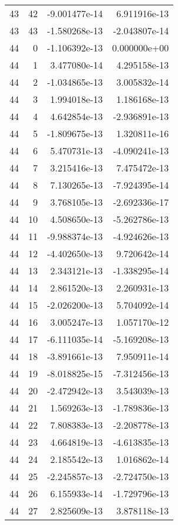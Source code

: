 \begin{tabular}{rrrr}
  43 &   42 & -9.001477e-14 &  6.911916e-13 \\
  43 &   43 & -1.580268e-13 & -2.043807e-14 \\
  44 &    0 & -1.106392e-13 &  0.000000e+00 \\
  44 &    1 &  3.477080e-14 &  4.295158e-13 \\
  44 &    2 & -1.034865e-13 &  3.005832e-14 \\
  44 &    3 &  1.994018e-13 &  1.186168e-13 \\
  44 &    4 &  4.642854e-13 & -2.936891e-13 \\
  44 &    5 & -1.809675e-13 &  1.320811e-16 \\
  44 &    6 &  5.470731e-13 & -4.090241e-13 \\
  44 &    7 &  3.215416e-13 &  7.475472e-13 \\
  44 &    8 &  7.130265e-13 & -7.924395e-14 \\
  44 &    9 &  3.768105e-13 & -2.692336e-17 \\
  44 &   10 &  4.508650e-13 & -5.262786e-13 \\
  44 &   11 & -9.988374e-13 & -4.924626e-13 \\
  44 &   12 & -4.402650e-13 &  9.720642e-14 \\
  44 &   13 &  2.343121e-13 & -1.338295e-14 \\
  44 &   14 &  2.861520e-13 &  2.260931e-13 \\
  44 &   15 & -2.026200e-13 &  5.704092e-14 \\
  44 &   16 &  3.005247e-13 &  1.057170e-12 \\
  44 &   17 & -6.111035e-14 & -5.169208e-13 \\
  44 &   18 & -3.891661e-13 &  7.950911e-14 \\
  44 &   19 & -8.018825e-15 & -7.312456e-13 \\
  44 &   20 & -2.472942e-13 &  3.543039e-13 \\
  44 &   21 &  1.569263e-13 & -1.789836e-13 \\
  44 &   22 &  7.808383e-13 & -2.208778e-13 \\
  44 &   23 &  4.664819e-13 & -4.613835e-13 \\
  44 &   24 &  2.185542e-13 &  1.016862e-14 \\
  44 &   25 & -2.245857e-13 & -2.724750e-13 \\
  44 &   26 &  6.155933e-14 & -1.729796e-13 \\
  44 &   27 &  2.825609e-13 &  3.878118e-13 \\

\end{tabular}
